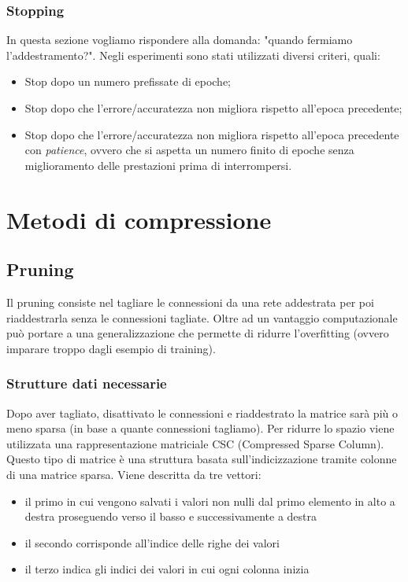 \documentclass[11pt,a4paper,twoside,
openright]{book}
\begin{document}
\subsection*{Stopping}
In questa sezione vogliamo rispondere alla domanda: "quando fermiamo l'addestramento?". Negli esperimenti sono stati utilizzati diversi criteri, quali:
\begin{itemize}
\item Stop dopo un numero prefissate di epoche;
\item Stop dopo che l'errore/accuratezza non migliora rispetto all'epoca precedente;
\item Stop dopo che l'errore/accuratezza non migliora rispetto all'epoca precedente con \textit{patience}, ovvero che si aspetta un numero finito di epoche senza miglioramento delle prestazioni prima di interrompersi.
\end{itemize}
















\chapter{Metodi di compressione}
\section{Pruning}
Il pruning consiste nel tagliare le connessioni da una rete addestrata per poi riaddestrarla senza le connessioni tagliate.
Oltre ad un vantaggio computazionale può portare a una generalizzazione che permette di ridurre l'overfitting (ovvero imparare troppo dagli esempio di training).
\subsection{Strutture dati necessarie}
Dopo aver tagliato, disattivato le connessioni e riaddestrato la matrice sarà più o meno sparsa (in base a quante connessioni tagliamo). Per ridurre lo spazio viene utilizzata una rappresentazione matriciale CSC (Compressed Sparse Column).
Questo tipo di matrice è una struttura basata sull'indicizzazione tramite colonne di una matrice sparsa. Viene descritta da tre vettori:
\begin{itemize}
\item il primo in cui vengono salvati i valori non nulli dal primo elemento in alto a destra proseguendo verso il basso e successivamente a destra
\item il secondo corrisponde all'indice delle righe dei valori
\item il terzo indica gli indici dei valori in cui ogni colonna inizia
\end{itemize}
\end{document}
